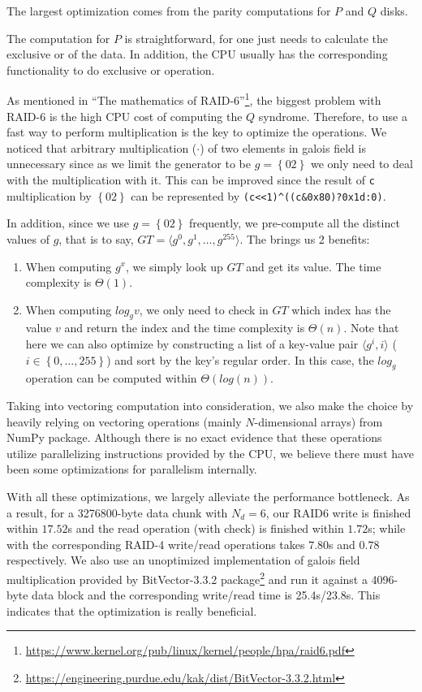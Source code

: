 The largest optimization comes from the parity computations for $P$ and $Q$ disks.

The computation for $P$ is straightforward, for one just needs to calculate the exclusive or of the data. In addition, the CPU usually has the corresponding functionality to do exclusive or operation.

As mentioned in ``The mathematics of RAID-6''\footnote{\url{https://www.kernel.org/pub/linux/kernel/people/hpa/raid6.pdf}}, the biggest problem with RAID-6 is the high CPU cost of computing the $Q$ syndrome. Therefore, to use a fast way to perform multiplication is the key to optimize the operations. We noticed that arbitrary multiplication ($\cdot$) of two elements in galois field is unnecessary since as we limit the generator to be $g=\left\{02\right\}$ we only need to deal with the multiplication with it. This can be improved since the result of \verb|c| multiplication by $\left\{02\right\}$ can be represented by \verb|(c<<1)^((c&0x80)?0x1d:0)|.

In addition, since we use $g=\left\{02\right\}$ frequently, we pre-compute all the distinct values of $g$, that is to say, $GT=\langle g^0, g^1, \ldots, g^{255}\rangle$. The brings us 2 benefits:

\begin{enumerate}
	\item When computing $g^{x}$, we simply look up $GT$ and get its value. The time complexity is $\Theta(1)$.
    \item When computing $log_{g}v$, we only need to check in $GT$ which index has the value $v$ and return the index and the time complexity is $\Theta(n)$. Note that here we can also optimize by constructing a list of a key-value pair $\langle g^{i}, i\rangle$ ($i\in\left\{0,\ldots,255\right\}$) and sort by the key's regular order. In this case, the $log_{g}$ operation can be computed within $\Theta(log{(n)})$.
\end{enumerate}

Taking into vectoring computation into consideration, we also make the choice by heavily relying on vectoring operations (mainly $N$-dimensional arrays) from NumPy package. Although there is no exact evidence that these operations utilize parallelizing instructions provided by the CPU, we believe there must have been some optimizations for parallelism internally.

With all these optimizations, we largely alleviate the performance bottleneck. As a result, for a 3276800-byte data chunk with $N_d=6$, our RAID6 write is finished within $17.52$s and the read operation (with check) is finished within $1.72$s; while with the corresponding RAID-4 write/read operations takes $7.80$s and $0.78$ respectively. We also use an unoptimized implementation of galois field multiplication provided by BitVector-3.3.2 package\footnote{\url{https://engineering.purdue.edu/kak/dist/BitVector-3.3.2.html}} and run it against a 4096-byte data block and the corresponding write/read time is 25.4s/23.8s. This indicates that the optimization is really beneficial.




